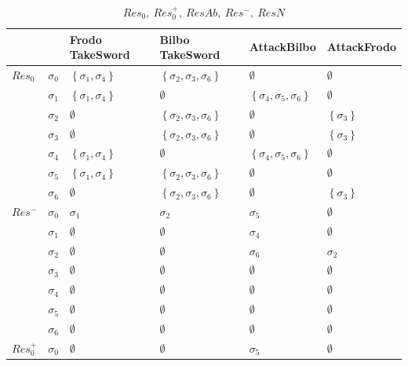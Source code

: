 \documentclass[11pt,a4paper]{article}
\begin{document}
 
    \begin{table}[]
\centering
\label{my-label}
\caption{$Res_0,~ Res_0^+,~ ResAb,~ Res^-,~ ResN$}
\begin{tabular}{|l|l|l|l|l|l|}
\hline
     &   & Frodo TakeSword & Bilbo TakeSword & AttackBilbo & AttackFrodo \\ \hline
$Res_0$ & $\sigma_0$ & $\left\{\sigma_1, \sigma_4\right\}$  & $\left\{\sigma_2, \sigma_3,\sigma_6\right\}$ & $\emptyset$ & $\emptyset$   \\ \hline
     & $\sigma_1$ &  $\left\{\sigma_1, \sigma_4\right\}$  & $\emptyset$ & $\left\{\sigma_4, \sigma_5,\sigma_6\right\}$  &  $\emptyset$  \\ \hline
     & $\sigma_2$ &  $\emptyset$  & $\left\{\sigma_2, \sigma_3,\sigma_6\right\}$ & $\emptyset$   &  $\left\{\sigma_3\right\}$ \\ \hline
     & $\sigma_3$ &  $\emptyset$  & $\left\{\sigma_2, \sigma_3,\sigma_6\right\}$ & $\emptyset$   &  $\left\{\sigma_3\right\}$ \\ \hline
     & $\sigma_4$ &  $\left\{\sigma_1, \sigma_4\right\}$  & $\emptyset$ & $\left\{\sigma_4, \sigma_5,\sigma_6\right\}$   &  $\emptyset$  \\ \hline
     & $\sigma_5$ &  $\left\{\sigma_1, \sigma_4\right\}$  & $\left\{\sigma_2, \sigma_3,\sigma_6\right\}$ & $\emptyset$   &  $\emptyset$  \\ \hline
     & $\sigma_6$ &  $\emptyset$  & $\left\{\sigma_2, \sigma_3,\sigma_6\right\}$ & $\emptyset$   &  $\left\{\sigma_3\right\}$  \\ \hline
$Res^-$ & $\sigma_0$ &  $\sigma_1$ & $\sigma_2$ & $\sigma_5$ & $\emptyset$   \\ \hline
     & $\sigma_1$ &  $\emptyset$  & $\emptyset$ & $\sigma_4$   &  $\emptyset$  \\ \hline
     & $\sigma_2$ &  $\emptyset$  & $\emptyset$ & $\sigma_6$   &  $\sigma_2$  \\ \hline
     & $\sigma_3$ &  $\emptyset$  & $\emptyset$ & $\emptyset$   &  $\emptyset$  \\ \hline
     & $\sigma_4$ &  $\emptyset$  & $\emptyset$ & $\emptyset$   &  $\emptyset$  \\ \hline
     & $\sigma_5$ &  $\emptyset$  & $\emptyset$ & $\emptyset$   &  $\emptyset$  \\ \hline
     & $\sigma_6$ &  $\emptyset$  & $\emptyset$ & $\emptyset$   &  $\emptyset$  \\ \hline
$Res_0^+$ & $\sigma_0$ &  $\emptyset$ & $\emptyset$ & $\sigma_5$ & $\emptyset$   \\ \hline

\end{tabular}
\end{table}
\end{document}
